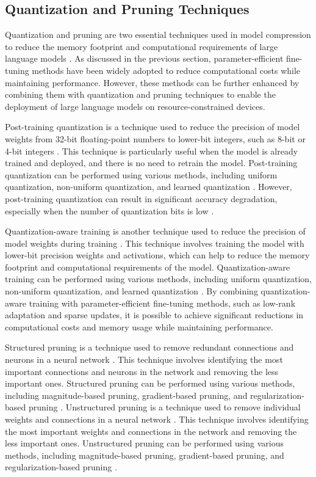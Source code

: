 \documentclass[11pt]{article}
\begin{document}
\subsection{Quantization and Pruning Techniques}

Quantization and pruning are two essential techniques used in model compression to reduce the memory footprint and computational requirements of large language models \cite{ref137}. As discussed in the previous section, parameter-efficient fine-tuning methods have been widely adopted to reduce computational costs while maintaining performance. However, these methods can be further enhanced by combining them with quantization and pruning techniques to enable the deployment of large language models on resource-constrained devices.

Post-training quantization is a technique used to reduce the precision of model weights from 32-bit floating-point numbers to lower-bit integers, such as 8-bit or 4-bit integers \cite{ref138}. This technique is particularly useful when the model is already trained and deployed, and there is no need to retrain the model. Post-training quantization can be performed using various methods, including uniform quantization, non-uniform quantization, and learned quantization \cite{ref139}. However, post-training quantization can result in significant accuracy degradation, especially when the number of quantization bits is low \cite{ref140}.

Quantization-aware training is another technique used to reduce the precision of model weights during training \cite{ref141}. This technique involves training the model with lower-bit precision weights and activations, which can help to reduce the memory footprint and computational requirements of the model. Quantization-aware training can be performed using various methods, including uniform quantization, non-uniform quantization, and learned quantization \cite{ref142}. By combining quantization-aware training with parameter-efficient fine-tuning methods, such as low-rank adaptation and sparse updates, it is possible to achieve significant reductions in computational costs and memory usage while maintaining performance.

Structured pruning is a technique used to remove redundant connections and neurons in a neural network \cite{ref143}. This technique involves identifying the most important connections and neurons in the network and removing the less important ones. Structured pruning can be performed using various methods, including magnitude-based pruning, gradient-based pruning, and regularization-based pruning \cite{ref144}. Unstructured pruning is a technique used to remove individual weights and connections in a neural network \cite{ref145}. This technique involves identifying the most important weights and connections in the network and removing the less important ones. Unstructured pruning can be performed using various methods, including magnitude-based pruning, gradient-based pruning, and regularization-based pruning \cite{ref146}.
\end{document}
